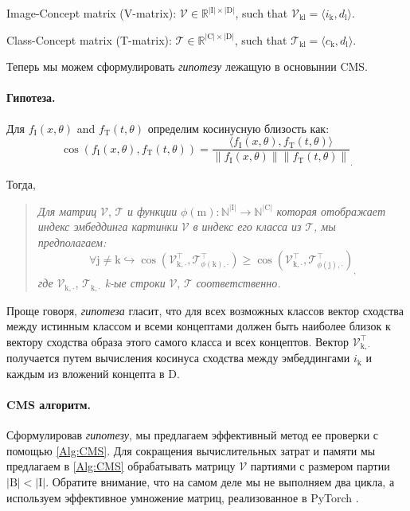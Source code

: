 Image-Concept matrix (V-matrix): $\mathcal{V}\in \mathbb{R}^{|\mathrm{I}|\times|\mathrm{D}|}$, such that $\mathcal{V}_{\mathrm{kl}} =\langle i_\mathrm{k}, d_\mathrm{l}\rangle$.

Class-Concept matrix (T-matrix): $\mathcal{T}\in\mathbb{R}^{|\mathrm{C}|\times|\mathrm{D}|}$, such that $\mathcal{T}_{\mathrm{kl}} = \langle c_\mathrm{k}, d_\mathrm{l} \rangle$.

Теперь мы можем сформулировать \textit{гипотезу} лежащую в основынии CMS.

\paragraph{Гипотеза.}

Для $f_{\mathrm{I}}(x,\theta)$ and $f_{\mathrm{T}}(t,\theta)$ определим косинусную близость как:
\[ 
\cos(f_{\mathrm{I}}(x, \theta), f_{\mathrm{T}}(t, \theta)) = \frac{\langle f_{\mathrm{I}}(x, \theta), f_{\mathrm{T}}(t, \theta) \rangle}{\|f_{\mathrm{I}}(x, \theta)\| \|f_{\mathrm{T}}(t, \theta)\|}_.
\]

Тогда,
\begin{quote}
\textit{Для матриц} $\mathcal{V}$, $\mathcal{T}$ \textit{и функции} $\phi(\mathrm{m})\colon \mathbb{N}^{|\mathrm{I}|} \to \mathbb{N}^{|\mathrm{C}|}$ \textit{которая отображает индекс эмбеддинга картинки} $\mathcal{V}$ \textit{в индекс его класса из} $\mathcal{T}$\textit{, мы предполагаем:}
\[
\forall \mathrm{j}\neq \mathrm{k} \hookrightarrow \cos(\mathcal{V}_{\mathrm{k},\cdot}^\top, \mathcal{T}_{\phi(\mathrm{k}),\cdot}^\top) \geq \cos(\mathcal{V}_{\mathrm{k},\cdot}^\top, \mathcal{T}_{\phi(\mathrm{j}),\cdot}^\top)_,
\]
\textit{где} $\mathcal{V}_{\mathrm{k},\cdot}$, $\mathcal{T}_{\mathrm{k},\cdot}$ \textit{k-ые строки} $\mathcal{V}$, $\mathcal{T}$ \textit{соответственно.}
\end{quote}

Проще говоря, \textit{гипотеза} гласит, что для всех возможных классов вектор сходства между истинным классом и всеми концептами должен быть наиболее близок к вектору сходства образа этого самого класса и всех концептов. Вектор $\mathcal{V}_{\mathrm{k},\cdot}^\top$ получается путем вычисления косинуса сходства между эмбеддингами $i_{\mathrm{k}}$
и каждым из вложений концепта в $\mathrm{D}$.

\paragraph{CMS алгоритм.}  Сформулировав \textit{гипотезу}, мы предлагаем эффективный метод ее проверки с помощью \cref{Alg:CMS}. Для сокращения вычислительных затрат и памяти мы предлагаем в \cref{Alg:CMS} обрабатывать матрицу $\mathcal{V}$ партиями с размером партии $|\mathrm{B}|<|\mathrm{I}|$. Обратите внимание, что на самом деле мы не выполняем два цикла, а используем эффективное умножение матриц, реализованное в PyTorch \cite{paszke2019pytorch}.

